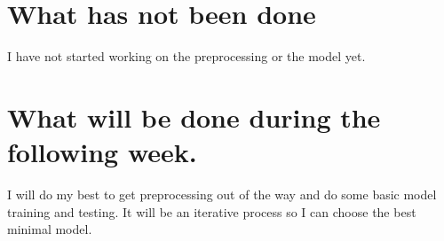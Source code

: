 \documentclass[11pt]{report}
\begin{document}
\section{What has not been done}

I have not started working on the preprocessing or the model yet.

\section{What will be done during the following week.}

I will do my best to get preprocessing out of the way and do some basic model training and testing.
It will be an iterative process
so I can choose the best minimal model.
\end{document}
